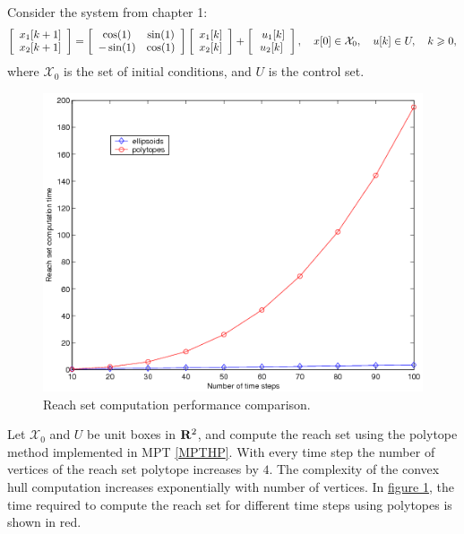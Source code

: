 \documentclass[letterpaper,10pt,english]{sphinxmanual}
\begin{document}
Consider the system from chapter 1:
\begin{gather}
\begin{split}\left[\begin{array}{c}
x_1[k+1]\\
x_2[k+1]\end{array}\right] = \left[\begin{array}{cc}
\cos(1) & \sin(1)\\
-\sin(1) & \cos(1)\end{array}\right]\left[\begin{array}{c}
x_1[k]\\
x_2[k]\end{array}\right] + \left[\begin{array}{c}\
u_1[k]\\
u_2[k]\end{array}\right], ~~~ x[0]\in{\mathcal X}_0, ~~~ u[k]\in U, ~~~ k\geqslant0,\end{split}\notag
\end{gather}
where ${\mathcal X}_0$ is the set of initial conditions, and
$U$ is the control set.
\begin{figure}[htbp]
\centering
\capstart

\includegraphics{ellpoly.png}
\caption{Reach set computation performance comparison.}\label{main_source:ellpolyfig}\end{figure}

Let ${\mathcal X}_0$ and $U$ be unit boxes in
${\bf R}^2$, and compute the reach set using the polytope method
implemented in MPT {\hyperref[main_source:mpthp]{{[}MPTHP{]}}}. With every
time step the number of vertices of the reach set polytope increases by
$4$. The complexity of the convex hull computation increases
exponentially with number of vertices. In \hyperref[main_source:ellpolyfig]{figure  \ref*{main_source:ellpolyfig}}, the time
required to compute the reach set for different time steps using
polytopes is shown in red.
\end{document}
